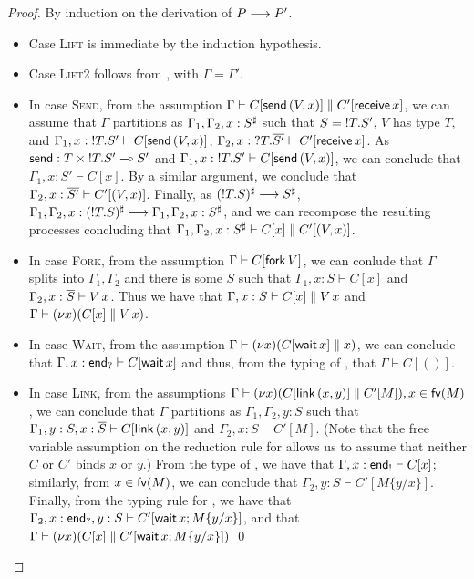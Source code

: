 \documentclass[orivec,envcountsame]{llncs}
\begin{document}
\begin{proof}
  By induction on the derivation of $P \longrightarrow P'$.
  \begin{itemize}
  \item Case \textsc{Lift} is immediate by the induction hypothesis.
  \item Case \textsc{Lift2} follows from , with $\Gamma = \Gamma'$.
  \item In case \textsc{Send}, from the assumption $\Gamma \vdash C[\mathsf{send}\,(V,x)] \parallel
    C'[\mathsf{receive} \, x]$, we can assume that $\Gamma$ partitions as
    $\Gamma_1,\Gamma_2,x:S^\sharp$ such that $S = {!T.S'}$, $V$ has type $T$, and
    $\Gamma_1,x:{!T.S'} \vdash C[\mathsf{send} \, (V,x)]$,
    $\Gamma_2,x:{?T.\overline{S'}} \vdash C'[\mathsf{receive} \, x]$.  As $\mathsf{send} : T
    \times {!T.S'} \multimap S'$ and $\Gamma_1,x:{!T.S'} \vdash C[\mathsf{send} \,
    (V,x)]$, we can conclude that $\Gamma_1,x:S' \vdash C[x]$.  By a similar argument, we conclude
    that $\Gamma_2,x:\overline{S'} \vdash C'[(V,x)]$. Finally, as $({!T.S})^\sharp \longrightarrow
    S^\sharp$, $\Gamma_1,\Gamma_2,x:({!T.S})^\sharp \longrightarrow
    \Gamma_1,\Gamma_2,x:S^\sharp$, and we can recompose the resulting processes concluding that
    $\Gamma_1,\Gamma_2,x:S^\sharp \vdash C[x] \parallel C'[(V,x)]$.
  \item In case \textsc{Fork}, from the assumption $\Gamma \vdash C[\mathsf{fork} \, V]$, we can
    conlude that $\Gamma$ splits into $\Gamma_1,\Gamma_2$ and there is some $S$ such that
    $\Gamma_1,x:S \vdash C[x]$ and $\Gamma_2,x:\overline{S} \vdash V \, x$.  Thus we have that
    $\Gamma,x:S \vdash C[x] \parallel V \, x$ and $\Gamma \vdash (\nu x)(C[x] \parallel
    V \, x)$.
  \item In case \textsc{Wait}, from the assumption $\Gamma \vdash (\nu x)(C[\mathsf{wait} \,
    x] \parallel x)$, we can conclude that $\Gamma,x:\mathsf{end}_? \vdash C[\mathsf{wait} \, x]$ and
    thus, from the typing of , that $\Gamma \vdash C[()]$.
  \item In case \textsc{Link}, from the assumptions $\Gamma \vdash (\nu x) (C[\mathsf{link} \,
    (x, y)] \parallel C'[M]), x \in \mathsf{fv}(M)$, we can conclude that $\Gamma$ partitions as
    $\Gamma_1,\Gamma_2,y:S$ such that $\Gamma_1,y:S,x:\overline{S} \vdash C[\mathsf{link} \, (x,
    y)]$ and $\Gamma_2,x:S \vdash C'[M]$.  (Note that the free variable assumption on the reduction
    rule for  allows us to assume that neither $C$ or $C'$ binds $x$ or $y$.)  From
    the type of , we have that $\Gamma,x:\mathsf{end}_! \vdash C[x]$; similarly, from $x \in
    \mathsf{fv}(M)$, we can conclude that $\Gamma_2,y:S \vdash C'[M\{y/x\}]$.  Finally, from the typing rule
    for , we have that $\Gamma_2,x:\mathsf{end}_?,y:S \vdash C'[\mathsf{wait}
      \, x; M\{y/x\}]$, and that $\Gamma \vdash (\nu x)(C[x] \parallel
    C'[\mathsf{wait} \, x; M\{y/x\}])$ \qed
  \end{itemize}
\end{proof}
\end{document}

